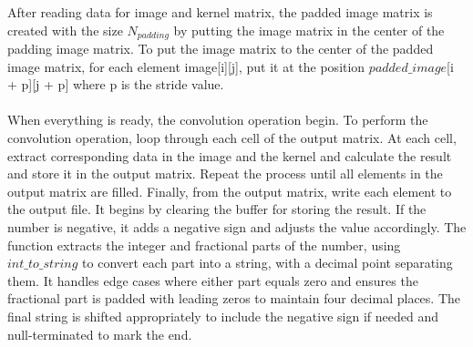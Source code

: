 \documentclass[a4paper]{article}
\begin{document}
After reading data for image and kernel matrix, the padded image matrix is created with the size $N_{padding}$ by putting the image matrix in the center of the padding image matrix. To put the image matrix to the center of the padded image matrix, for each element image[i][j], put it at the position $padded\_image$[i + p][j + p] where p is the stride value.\\ \\
When everything is ready, the convolution operation begin. To perform the convolution operation, loop through each cell of the output matrix. At each cell, extract corresponding data in the image and the kernel and calculate the result and store it in the output matrix. Repeat the process until all elements in the output matrix are filled. Finally, from the output matrix, write each element to the output file. It begins by clearing the buffer for storing the result. If the number is negative, it adds a negative sign and adjusts the value accordingly. The function extracts the integer and fractional parts of the number, using $int\_to\_string$ to convert each part into a string, with a decimal point separating them. It handles edge cases where either part equals zero and ensures the fractional part is padded with leading zeros to maintain four decimal places. The final string is shifted appropriately to include the negative sign if needed and null-terminated to mark the end.  
\end{document}
